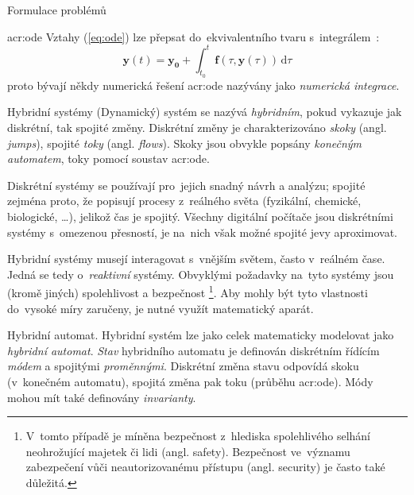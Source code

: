 \documentclass[thesis=M,czech]{FITthesis}[2012/06/26]
\newcommand{\acrlabel}[1]{acr:#1}
\newcommand{\acr}[1]{\acrshort{\acrlabel{#1}}}
\newcommand{\acrf}[1]{\acrfull{\acrlabel{#1}}}
\newcommand{\hl}[1]{\textit{#1}}
\newcommand{\name}[1]{\hl{#1}}
\newcommand{\cit}[1]{\cite{#1}}
\newcommand{\rf}[1]{\ref{#1}}
\newcommand{\rfeq}[1]{(\rf{eq:#1})}
\renewcommand{\vec}[1]{\ensuremath{\boldsymbol{#1}}}
\begin{document}
\begin{section}{Formulace problémů}
\begin{subsection}{\acrf{ode}}
Vztahy \rfeq{ode}
lze přepsat do~ekvivalentního tvaru s~integrálem~\cit{ode-lec}:
\begin{equation}
   \vec{y}(t) = \vec{y_0} + \int_{t_0}^{t} \vec{f} \!
      \left( \tau, \vec{y}(\tau) \right) \, \text{d}\tau
\end{equation}
proto bývají někdy numerická řešení \acr{ode}
nazývány jako \name{numerická integrace}.
\end{subsection} %


\end{section} %


\begin{section}{Hybridní systémy}\label{s:theory:hybrid}
(Dynamický) systém se nazývá \name{hybridním},
pokud vykazuje jak diskrétní, tak spojité změny.
Diskrétní změny je charakterizováno \name{skoky} (angl. \name{jumps}),
spojité \name{toky} (angl. \name{flows}).
Skoky jsou obvykle popsány \name{konečným automatem},
toky pomocí soustav \acr{ode}.

Diskrétní systémy se používají pro~jejich snadný návrh a analýzu;
spojité zejména proto, že popisují procesy z~reálného světa
(fyzikální, chemické, biologické, \dots),
jelikož čas je spojitý.
Všechny digitální počítače jsou diskrétními systémy
s~omezenou přesností,
je na~nich však možné spojité jevy aproximovat.

Hybridní systémy musejí interagovat s~vnějším světem,
často v~reálném čase.
Jedná se tedy o~\name{reaktivní} systémy.
Obvyklými požadavky na~tyto systémy
jsou (kromě jiných) spolehlivost a bezpečnost%
\footnote{V~tomto případě je míněna
bezpečnost z~hlediska spolehlivého selhání
neohrožující majetek či lidi (angl. safety).
Bezpečnost ve~významu zabezpečení
vůči neautorizovanému přístupu (angl. security)
je často také důležitá.}.
Aby mohly být tyto vlastnosti do~vysoké míry zaručeny,
je nutné využít matematický aparát.


\begin{paragraph}{Hybridní automat.}\label{s:theory:hybrid:auto}
Hybridní systém lze jako celek
matematicky modelovat jako \name{hybridní automat}.
\name{Stav} hybridního automatu
je definován diskrétním řídícím \name{módem}
a spojitými \name{proměnnými}.
Diskrétní změna stavu odpovídá skoku
(v~konečném automatu),
spojitá změna pak toku
(průběhu \acr{ode}).
Módy mohou mít také definovány \name{invarianty}.


\end{paragraph}
\end{section}
\end{document}
